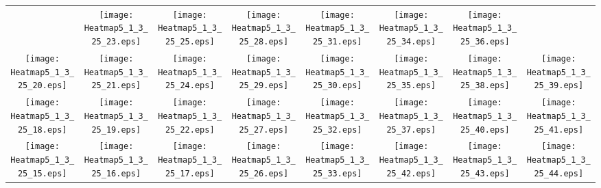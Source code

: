 \documentclass{standalone}
\begin{document}
\renewcommand{\arraystretch}{0}
\setlength{\tabcolsep}{0pt}
\begin{tabular}{ *8{c} }
 & \texttt{[image: Heatmap5\_1\_3\_25\_23.eps]} & \texttt{[image: Heatmap5\_1\_3\_25\_25.eps]} & \texttt{[image: Heatmap5\_1\_3\_25\_28.eps]} & \texttt{[image: Heatmap5\_1\_3\_25\_31.eps]} & \texttt{[image: Heatmap5\_1\_3\_25\_34.eps]} & \texttt{[image: Heatmap5\_1\_3\_25\_36.eps]} &  \\
\texttt{[image: Heatmap5\_1\_3\_25\_20.eps]} & \texttt{[image: Heatmap5\_1\_3\_25\_21.eps]} & \texttt{[image: Heatmap5\_1\_3\_25\_24.eps]} & \texttt{[image: Heatmap5\_1\_3\_25\_29.eps]} & \texttt{[image: Heatmap5\_1\_3\_25\_30.eps]} & \texttt{[image: Heatmap5\_1\_3\_25\_35.eps]} & \texttt{[image: Heatmap5\_1\_3\_25\_38.eps]} & \texttt{[image: Heatmap5\_1\_3\_25\_39.eps]} \\
\texttt{[image: Heatmap5\_1\_3\_25\_18.eps]} & \texttt{[image: Heatmap5\_1\_3\_25\_19.eps]} & \texttt{[image: Heatmap5\_1\_3\_25\_22.eps]} & \texttt{[image: Heatmap5\_1\_3\_25\_27.eps]} & \texttt{[image: Heatmap5\_1\_3\_25\_32.eps]} & \texttt{[image: Heatmap5\_1\_3\_25\_37.eps]} & \texttt{[image: Heatmap5\_1\_3\_25\_40.eps]} & \texttt{[image: Heatmap5\_1\_3\_25\_41.eps]} \\
\texttt{[image: Heatmap5\_1\_3\_25\_15.eps]} & \texttt{[image: Heatmap5\_1\_3\_25\_16.eps]} & \texttt{[image: Heatmap5\_1\_3\_25\_17.eps]} & \texttt{[image: Heatmap5\_1\_3\_25\_26.eps]} & \texttt{[image: Heatmap5\_1\_3\_25\_33.eps]} & \texttt{[image: Heatmap5\_1\_3\_25\_42.eps]} & \texttt{[image: Heatmap5\_1\_3\_25\_43.eps]} & \texttt{[image: Heatmap5\_1\_3\_25\_44.eps]} \\

\end{tabular}
\end{document}
